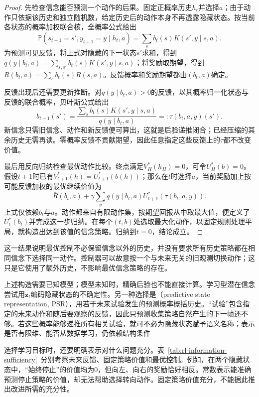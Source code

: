 \begin{proof}
  先检查信念能否预测一个动作的后果。固定正概率历史$h_t$并选择$a$；由于动作只依据该历史和独立随机数，给定历史后的动作本身不再透露隐藏状态。按当前各状态的概率加权联合核，全概率公式给出
  \[
    \mathbb P(s_{t+1}=s',y_{t+1}=y\mid h_t,a)
    =\sum_s b_t(s)K(s',y\mid s,a).
  \]
  为预测可见反馈，将上式对隐藏的下一状态$s'$求和，得到
  $q(y\mid b_t,a)=\sum_{s,s'}b_t(s)K(s',y\mid s,a)$；将奖励取期望，得到
  $\bar R(b_t,a)=\sum_s b_t(s)R(s,a)$。反馈概率和奖励期望都由$(b_t,a)$确定。

  反馈出现后还需要更新推断。对$q(y\mid b_t,a)>0$的反馈，以其概率归一化状态与反馈的联合概率，贝叶斯公式给出
  \[
    b_{t+1}(s')
    =\frac{\sum_s b_t(s)K(s',y\mid s,a)}
           {q(y\mid b_t,a)}
    =:\tau(b_t,a,y)(s').
  \]
  新信念只需旧信念、动作和新反馈便可算出，这就是后验递推闭合；已经压缩的其余历史无需再读。零概率反馈不贡献期望，因此任意指定这些反馈上的$\tau$都不改变价值。

  最后用反向归纳检查最优动作比较。终点满足$V_H^*(h_H)=0$，可令$U_H^*(b)=0$。假设$t+1$时已有$V_{t+1}^*(h)=U_{t+1}^*(b(h))$；那么在$t$时选择$a$，当前奖励加上按可能反馈加权的最优继续价值为
  \[
    \bar R(b_t,a)
    +\gamma\sum_y q(y\mid b_t,a)
                      U_{t+1}^*(\tau(b_t,a,y)).
  \]
  上式仅依赖$b_t$与$a$。动作都来自有限动作集，按期望回报从中取最大值，便定义了$U_t^*(b_t)$并完成这一步归纳。在每个$(t,b)$处选取最大化动作，以固定规则处理平局，就构造出达到该值的信念策略。归纳到$t=0$，结论成立。
\end{proof}

这一结果说明最优控制不必保留信念以外的历史，并没有要求所有历史策略都在相同信念下选择同一动作。控制器可以故意按一个与未来无关的旧观测切换动作；这只是它使用了额外历史，不影响最优信念策略的存在。

上述构造需要已知模型；模型未知时，精确后验也不能直接计算。学习型潜在信念尝试用$\bm z_t$编码隐藏状态的不确定性。另一种选择是（predictive state representation, PSR），用若干未来试验发生的预测概率概括历史。“试验”包含指定的未来动作和随后要观察的反馈，因此只预测收集策略自然产生的下一帧还不够。若这些概率能够递推所有相关试验，就可不必为隐藏状态赋予语义名称；表示是否有限维、能否从数据学习，仍依赖结构条件

选择学习目标时，还要明确表示对什么问题充分。表~\ref{tab:rl-information-sufficiency}~分别考察未来反馈、固定策略价值和最优控制。例如，在两个隐藏状态中，“始终停止”的价值均为0，但向左、向右的奖励恰好相反。常数表示能准确预测停止策略的价值，却无法帮助选择转向动作。固定策略价值充分，不能据此推出改进所需的充分性。

